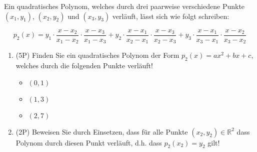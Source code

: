 Ein quadratisches Polynom, welches durch drei paarweise verschiedene Punkte $(x_1,y_1)$, $(x_2,y_2)$ und $(x_3,y_3)$ verläuft, lässt sich wie folgt schreiben:

$$
p_2(x) =
y_1\cdot\frac{x-x_2}{x_1-x_2}\cdot\frac{x-x_3}{x_1-x_3} +
y_2\cdot\frac{x-x_1}{x_2-x_1}\cdot \frac{x-x_3}{x_2-x_3} +
y_3\cdot\frac{x-x_1}{x_3-x_1}\cdot\frac{x-x_2}{x_3-x_2}
$$


\begin{enumerate}[label=(\alph*)]

\item (5P) Finden Sie ein quadratisches Polynom der Form $p_2(x)=ax^2+bx+c$, welches durch die folgenden Punkte verläuft!

\begin{itemize}
\item $(0,1)$
\item $(1,3)$
\item $(2,7)$
\end{itemize}

\bigskip
\bigskip
\bigskip
\bigskip
\bigskip
\bigskip
\bigskip
\bigskip
\bigskip
\bigskip
\bigskip
\bigskip

\item (2P) Beweisen Sie durch Einsetzen, dass für alle Punkte $(x_2,y_2)\in\mathbb{R}^2$ dass Polynom durch diesen Punkt verläuft, d.h. dass $p_2(x_2) = y_2$ gilt!

\end{enumerate}
